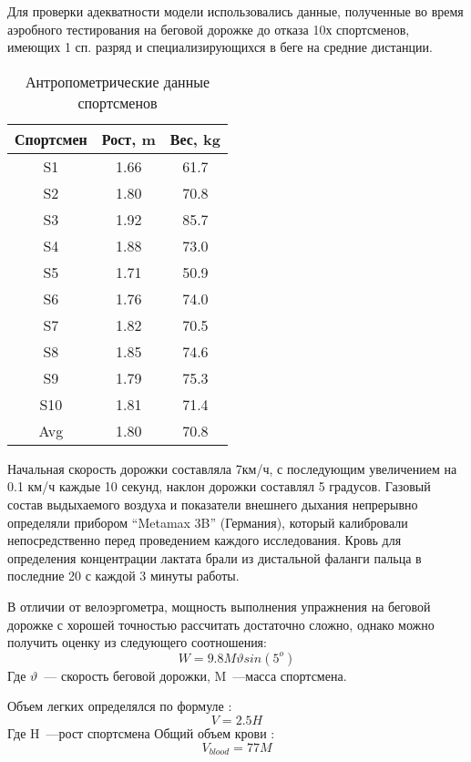 Для проверки адекватности модели использовались данные, полученные во время аэробного тестирования на беговой дорожке до отказа 10х спортсменов, имеющих 1 сп. разряд и специализирующихся в беге на средние дистанции. 
\begin{table}[!ht]
\centering
\caption{Антропометрические данные спортсменов}
\medskip
\label{tabular:tab1}
\begin{tabular}{|c|c|c|}
\hline
Спортсмен & Рост, m  & Вес, kg \\
\hline
S1 & 1.66 & 61.7 \\
\hline
S2 & 1.80 & 70.8 \\
\hline
S3 & 1.92 & 85.7  \\
\hline
S4 & 1.88 & 73.0  \\
\hline
S5 & 1.71 & 50.9  \\
\hline
S6 & 1.76 & 74.0  \\
\hline
S7 & 1.82 & 70.5  \\
\hline
S8 & 1.85 & 74.6  \\
\hline
S9 & 1.79 & 75.3  \\
\hline
S10 & 1.81 & 71.4  \\
\hline
Avg & 1.80 & 70.8  \\
\hline
\end{tabular}
\end{table}
Начальная скорость дорожки составляла 7км/ч, с последующим увеличением на 0.1 км/ч каждые 10 секунд, наклон дорожки составлял 5 градусов. Газовый состав выдыхаемого воздуха и показатели внешнего дыхания непрерывно определяли прибором “Metamax 3B” (Германия), который калибровали непосредственно перед проведением каждого исследования. Кровь для определения концентрации лактата брали из дистальной фаланги пальца в последние 20 с каждой 3 минуты работы.

В отличии от велоэргометра, мощность выполнения упражнения на беговой дорожке с хорошей точностью рассчитать достаточно сложно, однако можно получить оценку из следующего соотношения:
\begin{equation}
    W=9.8M\vartheta sin(5^{o})
\end{equation}
Где \(\vartheta\)~--- скорость беговой дорожки, M~---масса спортсмена.

Объем легких определялся по формуле \cite{schmidt}:
\begin{equation}
    V=2.5H
\end{equation}
Где H~---рост спортсмена
Общий объем крови \cite{schmidt}:
\begin{equation}
    V_{blood}=77M
\end{equation}

